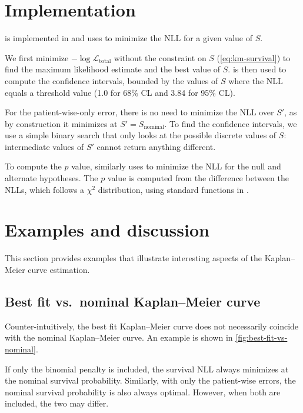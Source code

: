 \documentclass[article]{jss}
\newcommand{\KM}{Kaplan--Meier} %
\begin{document}
\section{Implementation}

 is implemented in  and uses  \citep{gurobi} to minimize the NLL for a given value of \(S\).

We first minimize \(-\log \mathcal{L}_{\text{total}}\) without the constraint on \(S\) (\ref{eq:km-survival}) to find the maximum likelihood estimate and the best value of \(S\)\@.  \citep{brentq,scipy} is then used to compute the confidence intervals, bounded by the values of \(S\) where the NLL equals a threshold value (1.0 for 68\% CL and 3.84 for 95\% CL).

For the patient-wise-only error, there is no need to minimize the NLL over \(S'\), as by construction it minimizes at \(S'=S_\text{nominal}\). To find the confidence intervals, we use a simple binary search that only looks at the possible discrete values of \(S\): intermediate values of \(S'\) cannot return anything different.

To compute the \(p\) value,  similarly uses  to minimize the NLL for the null and alternate hypotheses. The \(p\) value is computed from the difference between the NLLs, which follows a \(\chi^2\) distribution, using standard functions in .

\section{Examples and discussion}

This section provides examples that illustrate interesting aspects of the \KM{} curve estimation.

\subsection%
[Best fit vs. nominal \KM{} curve]%
{Best fit vs.\ nominal \KM{} curve}

Counter-intuitively, the best fit \KM{} curve does not necessarily coincide with the nominal \KM{} curve. An example is shown in \cref{fig:best-fit-vs-nominal}.

If only the binomial penalty is included, the survival NLL always minimizes at the nominal survival probability. Similarly, with only the patient-wise errors, the nominal survival probability is also always optimal. However, when both are included, the two may differ.
\end{document}
